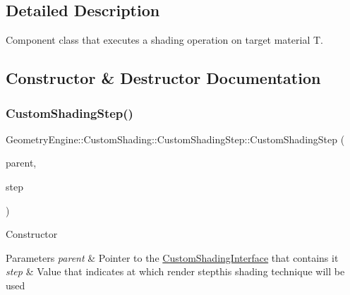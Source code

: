 \subsection{Detailed Description}
Component class that executes a shading operation on target material T. 

\subsection{Constructor \& Destructor Documentation}
\mbox{\label{class_geometry_engine_1_1_custom_shading_1_1_custom_shading_step_aa1a71e276f9a94557ca2fd8db4c1f438}} 
\subsubsection{\texorpdfstring{CustomShadingStep()}{CustomShadingStep()}\hspace{0.1cm}{\footnotesize\ttfamily [1/2]}}
{\footnotesize\ttfamily Geometry\+Engine\+::\+Custom\+Shading\+::\+Custom\+Shading\+Step\+::\+Custom\+Shading\+Step (\begin{DoxyParamCaption}\item[{\mbox{\hyperlink{class_geometry_engine_1_1_custom_shading_1_1_custom_shading_interface}{Custom\+Shading\+Interface}} $\ast$}]{parent,  }\item[{\mbox{\hyperlink{namespace_geometry_engine_1_1_custom_shading_a2dc236a5b567da5099069ce2b2be5609}{Custom\+Shading\+Steps}}}]{step }\end{DoxyParamCaption})}

Constructor 
\begin{DoxyParams}{Parameters}
{\em parent} & Pointer to the \mbox{\hyperlink{class_geometry_engine_1_1_custom_shading_1_1_custom_shading_interface}{Custom\+Shading\+Interface}} that contains it \\
\hline
{\em step} & Value that indicates at which render stepthis shading technique will be used \\
\hline
\end{DoxyParams}
\mbox{\label{class_geometry_engine_1_1_custom_shading_1_1_custom_shading_step_a78d86dd99b93d0ae1c9a4de8f01a4f1a}} 
